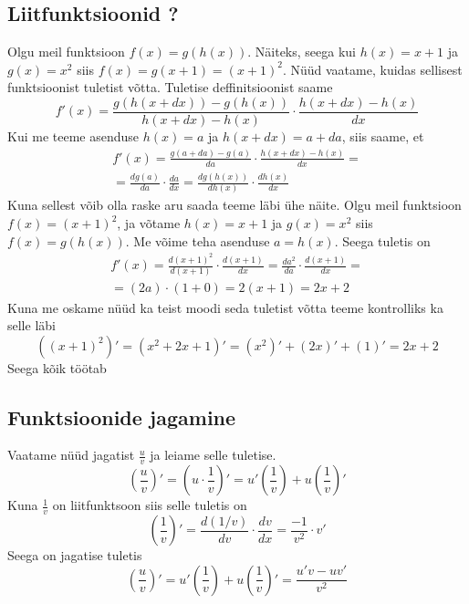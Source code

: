 \documentclass[a4paper,11pt,twocolumn]{article}
\begin{document}
\subsection{Liitfunktsioonid ?}
Olgu meil funktsioon $f(x) = g(h(x))$. Näiteks, seega kui $h(x) = x+1$ ja $g(x) = x^2$ siis $f(x) = g(x+1) = (x+1)^2$. Nüüd vaatame, kuidas sellisest funktsioonist tuletist võtta. Tuletise deffinitsioonist saame
\begin{equation*}
f'(x) = \frac{g(h(x+dx)) - g(h(x))}{h(x+dx) - h(x)} \cdot \frac{h(x+dx) - h(x)}{dx}
\end{equation*}
Kui me teeme asenduse $h(x) = a$ ja $h(x+dx) = a + da$, siis saame, et
\begin{multline*}
f'(x) = \frac{g(a+da) - g(a)}{da} \cdot \frac{h(x+dx) - h(x)}{dx} = \\
= \frac{dg(a)}{da}\cdot\frac{da}{dx} = \frac{dg(h(x))}{dh(x)}\cdot\frac{dh(x)}{dx}
\end{multline*}
Kuna sellest võib olla raske aru saada teeme läbi ühe näite. Olgu meil funktsioon $f(x) = (x+1)^2$, ja võtame $h(x) = x+1$ ja $g(x) = x^2$ siis $f(x) = g(h(x))$. Me võime teha asenduse $a = h(x)$. Seega tuletis on 
\begin{multline*}
f'(x) = \frac{d(x+1)^2}{d(x+1)} \cdot \frac{d(x+1)}{dx} = \frac{d a^2}{da} \cdot \frac{d(x+1)}{dx} =\\
= (2a) \cdot (1+0) = 2(x+1) = 2x+2
\end{multline*}
Kuna me oskame nüüd ka teist moodi seda tuletist võtta teeme kontrolliks ka selle läbi
\begin{equation*}
((x+1)^2)' = (x^2 + 2x + 1)' = (x^2)' + (2x)' + (1)' = 2x + 2
\end{equation*}
Seega kõik töötab

\subsection{Funktsioonide jagamine}
Vaatame nüüd jagatist $\frac{u}{v}$ ja leiame selle tuletise.
\begin{equation*}
(\frac{u}{v})'= (u\cdot\frac{1}{v})'=u'(\frac{1}{v})+u(\frac{1}{v})'
\end{equation*}
Kuna $\frac{1}{v}$ on liitfunktsoon siis selle tuletis on
\begin{equation*}
(\frac{1}{v})' = \frac{d (1/v)}{dv} \cdot \frac{dv}{dx} = \frac{-1}{v^2} \cdot v'
\end{equation*}
Seega on jagatise tuletis 
\begin{equation*}
(\frac{u}{v})'=u'(\frac{1}{v})+u(\frac{1}{v})' = \frac{u'v-uv'}{v^2}
\end{equation*}
\end{document}
